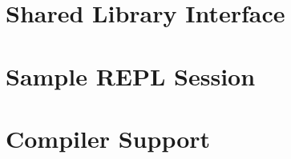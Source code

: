 \documentclass[index=totoc,bibliography=totoc]{scrartcl}
\newcommand{\mylisting}[2][]{%
}
\numberwithin{equation}{section}
\numberwithin{figure}{section}
\numberwithin{table}{section}
\begin{document}
\clearpage
\begin{appendices}

\makeatletter
{}
\makeatother


\section{Shared Library Interface}
\label{app:so}

\mylisting[
  caption={[FFI usage example]FFI usage example.},
  firstline=8,fontadjust,language=C,
  label=lst:so]{../src/rstsp/librstsp/test.c}

\section{Sample REPL Session}

%

\section{Compiler Support}
\label{app:compiler}


\end{appendices}

\printbibliography%
\end{document}
